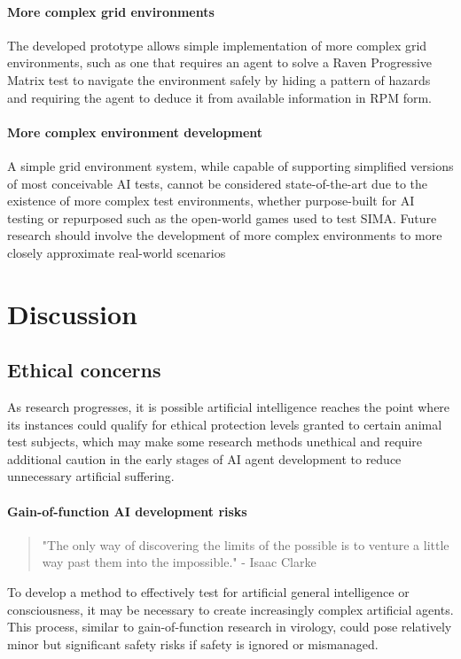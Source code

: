 \documentclass[masterthesis]{fer}
\begin{document}
\paragraph{More complex grid environments}
The developed prototype allows simple implementation of more complex grid environments, such as one that requires an agent to solve a Raven Progressive Matrix test to navigate the environment safely by hiding a pattern of hazards and requiring the agent to deduce it from available information in RPM form.
\paragraph{More complex environment development}
A simple grid environment system, while capable of supporting simplified versions of most conceivable AI tests, cannot be considered state-of-the-art due to the existence of more complex test environments, whether purpose-built for AI testing or repurposed such as the open-world games used to test SIMA. Future research should involve the development of more complex environments  to more closely approximate real-world scenarios
\section{Discussion}
\subsection{Ethical concerns}

As research progresses, it is possible artificial intelligence reaches the point where its instances could qualify for ethical protection levels granted to certain animal test subjects, which may make some research methods unethical and require additional caution in the early stages of AI agent development to reduce unnecessary artificial suffering.
\paragraph{Gain-of-function AI development risks}

\begin{quote}
"The only way of discovering the limits of the possible is to venture a little way past them into the impossible." - Isaac Clarke
\end{quote}
To develop a method to effectively test for artificial general intelligence or consciousness, it may be necessary to create increasingly complex artificial agents. This process, similar to gain-of-function research in virology, could pose relatively minor but significant safety risks if safety is ignored or mismanaged.
\end{document}
